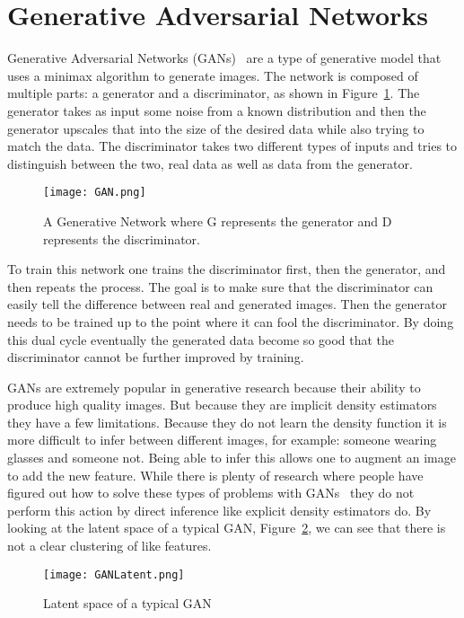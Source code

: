 \section{Generative Adversarial Networks}\label{sec:GAN}
Generative Adversarial Networks (GANs)~\cite{} are a type of generative model
that uses a minimax algorithm to generate images. The network is composed of
multiple parts: a generator and a discriminator, as shown in
Figure~\ref{fig:gan}. The generator takes as input some noise from a known
distribution and then the generator upscales that into the size of the desired
data while also trying to match the data. The discriminator takes two different
types of inputs and tries to distinguish between the two, real data as well as
data from the generator.

\begin{figure}[ht]
    \centering
    \texttt{[image: GAN.png]}
    \caption{A Generative Network where G represents the generator and D represents
        the discriminator.}
    \label{fig:gan}
\end{figure}

To train this network one trains the discriminator first, then the generator,
and then repeats the process. The goal is to make sure that the discriminator
can easily tell the difference between real and generated images. Then the
generator needs to be trained up to the point where it can fool the
discriminator. By doing this dual cycle eventually the generated data become so
good that the discriminator cannot be further improved by training. 

GANs are extremely popular in generative research because their ability to
produce high quality images. But because they are implicit density estimators
they have a few limitations. Because they do not learn the density function it
is more difficult to infer between different images, for example: someone
wearing glasses and someone not. Being able to infer this allows one to augment
an image to add the new feature. While there is plenty of research where people
have figured out how to solve these types of problems with GANs~\cite{} they do
not perform this action by direct inference like explicit density estimators do.
By looking at the latent space of a typical GAN, Figure~\ref{fig:ganLS}, we can
see that there is not a clear clustering of like features.

\begin{figure}[ht]
\centering
\texttt{[image: GANLatent.png]}
\caption{Latent space of a typical GAN}
\label{fig:ganLS}
\end{figure}

